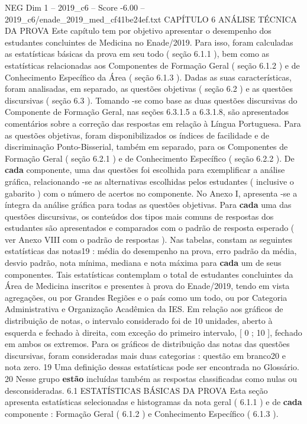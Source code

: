 \begin{textsample}{NEG Dim 1 – 2019\_c6 – Score -6.00 – 2019\_c6/enade\_2019\_med\_cf41be24ef.txt}  \label{ex:f1_neg_094}
CAPÍTULO 6 ANÁLISE TÉCNICA DA PROVA Este capítulo tem por objetivo apresentar o desempenho dos estudantes concluintes de Medicina no Enade/2019.
Para isso, foram calculadas as estatísticas básicas da prova em seu todo ( seção 6.1.1 ), bem como as estatísticas relacionadas aos Componentes de Formação Geral ( seção 6.1.2 ) e de Conhecimento Específico da Área ( seção 6.1.3 ).
Dadas as suas características, foram analisadas, em separado, as questões objetivas ( seção 6.2 ) e as questões discursivas ( seção 6.3 ).
Tomando -se como base as duas questões discursivas do Componente de Formação Geral, nas seções 6.3.1.5 a 6.3.1.8, são apresentados comentários sobre a correção das respostas em relação à Língua Portuguesa.
Para as questões objetivas, foram disponibilizados os índices de facilidade e de discriminação Ponto-Bisserial, também em separado, para os Componentes de Formação Geral ( seção 6.2.1 ) e de Conhecimento Específico ( seção 6.2.2 ).
De \textbf{cada} componente, uma das questões foi escolhida para exemplificar a análise gráfica, relacionando -se as alternativas escolhidas pelos estudantes ( inclusive o gabarito ) com o número de acertos no componente.
No Anexo I, apresenta -se a íntegra da análise gráfica para todas as questões objetivas.
Para \textbf{cada} uma das questões discursivas, os conteúdos dos tipos mais comuns de respostas dos estudantes são apresentados e comparados com o padrão de resposta esperado ( ver Anexo VIII com o padrão de respostas ).
Nas tabelas, constam as seguintes estatísticas das notas19 : média do desempenho na prova, erro padrão da média, desvio padrão, nota mínima, mediana e nota máxima para \textbf{cada} um de seus componentes.
Tais estatísticas contemplam o total de estudantes concluintes da Área de Medicina inscritos e presentes à prova do Enade/2019, tendo em vista agregações, ou por Grandes Regiões e o país como um todo, ou por Categoria Administrativa e Organização Acadêmica da IES.
Em relação aos gráficos de distribuição de notas, o intervalo considerado foi de 10 unidades, aberto à esquerda e fechado à direita, com exceção do primeiro intervalo, [ 0 ; 10 ], fechado em ambos os extremos.
Para os gráficos de distribuição das notas das questões discursivas, foram consideradas mais duas categorias : questão em branco20 e nota zero. 19 Uma definição dessas estatísticas pode ser encontrada no Glossário. 20 Nesse grupo \textbf{estão} incluídas também as respostas classificadas como nulas ou desconsideradas. 6.1 ESTATÍSTICAS BÁSICAS DA PROVA Esta seção apresenta estatísticas selecionadas e histogramas da nota geral ( 6.1.1 ) e de \textbf{cada} componente : Formação Geral ( 6.1.2 ) e Conhecimento Específico ( 6.1.3 ).

\end{textsample}
